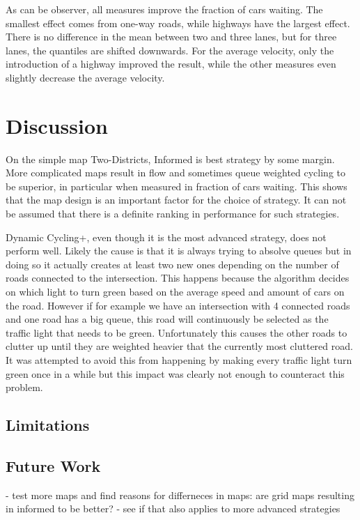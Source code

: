 \documentclass[11pt]{article}
\begin{document}
As can be observer, all measures improve the fraction of cars waiting. The smallest effect comes from one-way roads, while highways have the largest effect. There is no difference in the mean between two and three lanes, but for three lanes, the quantiles are shifted downwards. For the average velocity, only the introduction of a highway improved the result, while the other measures even slightly decrease the average velocity.

\section{Discussion}
\label{sec:discussion}

On the simple map Two-Districts, Informed is best strategy by some margin. More complicated maps result in flow and sometimes queue weighted cycling to be superior, in particular when measured in fraction of cars waiting. This shows that the map design is an important factor for the choice of strategy. It can not be assumed that there is a definite ranking in performance for such strategies.

Dynamic Cycling+, even though it is the most advanced strategy, does not perform well. Likely the cause is that it is always trying to absolve queues but in doing so it actually creates at least two new ones depending on the number of roads connected to the intersection. This happens because the algorithm decides on which light to turn green based on the average speed and amount of cars on the road. However if for example we have an intersection with 4 connected roads and one road has a big queue, this road will continuously be selected as the traffic light that needs to be green. Unfortunately this causes the other roads to clutter up until they are weighted heavier that the currently most cluttered road. It was attempted to avoid this from happening by making every traffic light turn green once in a while but this impact was clearly not enough to counteract this problem.

\subsection{Limitations}


\subsection{Future Work}

- test more maps and find reasons for differneces in maps: are grid maps resulting in informed to be better?
- see if that also applies to more advanced strategies
\end{document}
